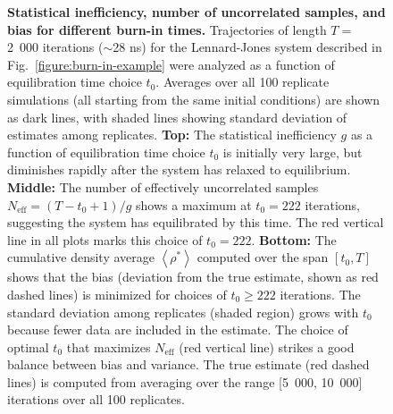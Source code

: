 \documentclass[aps,pre,twocolumn,nofootinbib,superscriptaddress,linenumbers,11point]{revtex4-1}
\begin{document}
\begin{figure}[tbp]
\caption{\label{figure:reverse-cumulative-average} {\bf Statistical inefficiency, number of uncorrelated samples, and bias for different burn-in times.} 
Trajectories of length $T = $ 2~000 iterations ($\sim$28 ns) for the Lennard-Jones system described in Fig.~\ref{figure:burn-in-example} were analyzed as a function of equilibration time choice $t_0$.
Averages over all 100 replicate simulations (all starting from the same initial conditions) are shown as dark lines, with shaded lines showing standard deviation of estimates among replicates.
{\bf Top:} The statistical inefficiency $g$ as a function of equilibration time choice $t_0$ is initially very large, but diminishes rapidly after the system has relaxed to equilibrium.
{\bf Middle:} The number of effectively uncorrelated samples $N_\mathrm{eff} = (T - t_0 + 1) / g$ shows a maximum at $t_0 = 222$ iterations, suggesting the system has equilibrated by this time.
The red vertical line in all plots marks this choice of $t_0 = 222$.
{\bf Bottom:} The cumulative density average $\left\langle \rho^* \right\rangle$ computed over the span $[t_0, T]$ shows that the bias (deviation from the true estimate, shown as red dashed lines) is minimized for choices of $t_0 \ge 222$ iterations.
The standard deviation among replicates (shaded region) grows with $t_0$ because fewer data are included in the estimate.
The choice of optimal $t_0$ that maximizes $N_\mathrm{eff}$ (red vertical line) strikes a good balance between bias and variance.
The true estimate (red dashed lines) is computed from averaging over the range [5~000, 10~000] iterations over all 100 replicates.
}
\end{figure}

\end{document}
